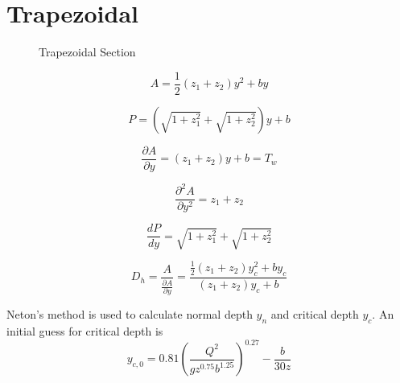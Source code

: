 \section{Trapezoidal}
\begin{figure}[h]
\centering
{}
\caption{Trapezoidal Section}
\end{figure}

\begin{equation}
A = \frac{1}{2} (z_1 + z_2) y^2 + by
\end{equation}

\begin{equation}
P = \left(\sqrt{1+z_1^2} + \sqrt{1+z_2^2}\right)y + b
\end{equation}

\begin{equation}
\frac{\partial A}{\partial y} = (z_1 + z_2)y + b = T_w
\end{equation}

\begin{equation}
\frac{\partial ^2A}{\partial y^2} = z_1 + z_2
\end{equation}

\begin{equation}
\frac{dP}{dy} = \sqrt{1+z_1^2} + \sqrt{1+z_2^2}
\end{equation}

\begin{equation}
D_h = \frac{A}{\frac{\partial A}{\partial y}} = \frac{ \frac{1}{2} (z_1 + z_2) y_c^2 + by_c}{(z_1 + z_2)y_c + b}
\end{equation}

\noindent Neton's method is used to calculate normal depth $y_n$ and critical depth $y_c$. An initial guess for critical depth \cite{French1985} is
\begin{equation}
y_{c,0} = 0.81 \left(\frac{Q^2}{g z^{0.75}b^{1.25}}\right)^{0.27} - \frac{b}{30z}
\end{equation}
